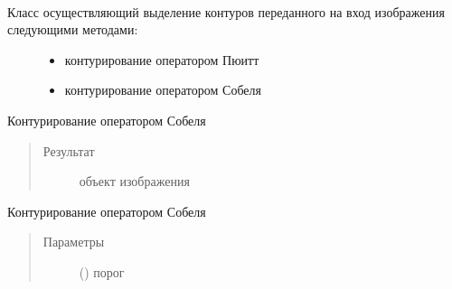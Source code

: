 \documentclass[letterpaper,10pt,russian]{sphinxmanual}
\begin{document}
\begin{fulllineitems}
\label{\detokenize{ContouredImage:ContouredImage.ContouredImage}}~\begin{description}
\item[{Класс осуществляющий выделение контуров переданного на вход изображения следующими методами:}] \leavevmode\begin{itemize}
\item {} 
{\hyperref[\detokenize{ContouredImage:ContouredImage.ContouredImage.prewitt_operator}]{}} \textendash{} контурирование оператором Пюитт

\item {} 
{\hyperref[\detokenize{ContouredImage:ContouredImage.ContouredImage.sobel_operator}]{}} \textendash{} контурирование оператором Собеля

\end{itemize}

\end{description}

\begin{fulllineitems}
\label{\detokenize{ContouredImage:ContouredImage.ContouredImage.prewitt_operator}}
Контурирование оператором Собеля
\begin{quote}\begin{description}
\item[{Результат}] \leavevmode
{\hyperref[\detokenize{BaseImage:core.LabImage}]{}} \textendash{} объект изображения

\end{description}\end{quote}

\end{fulllineitems}


\begin{fulllineitems}
\label{\detokenize{ContouredImage:ContouredImage.ContouredImage.sobel_operator}}
Контурирование оператором Собеля
\begin{quote}\begin{description}
\item[{Параметры}] \leavevmode
{} () \textendash{} порог


\end{description}
\end{quote}
\end{fulllineitems}
\end{fulllineitems}
\end{document}
